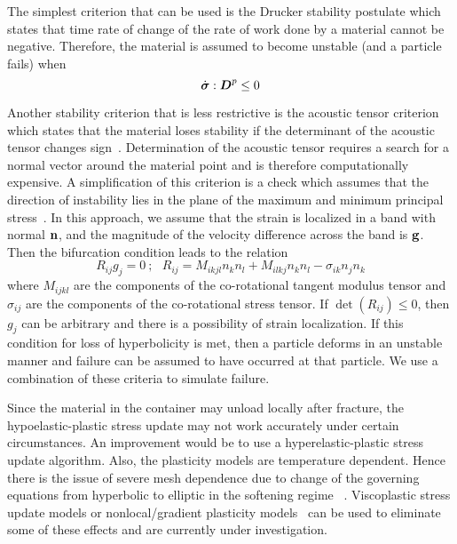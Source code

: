   The simplest criterion that can be used is the Drucker stability postulate 
  \cite{Drucker59} which states that time rate of change of the rate of 
  work done by a material cannot be negative.  Therefore, the material is 
  assumed to become unstable (and a particle fails) when
  \begin{equation}
    \dot\Bsig:\BD^p \le 0
  \end{equation}

  Another stability criterion that is less restrictive is the acoustic
  tensor criterion which states that the material loses stability if the 
  determinant of the acoustic tensor changes sign~\cite{Rudnicki75,Perzyna98}.  
  Determination of the acoustic tensor requires a search for a normal vector 
  around the material point and is therefore computationally expensive.  A 
  simplification of this criterion is a check which assumes that the direction 
  of instability lies in the plane of the maximum and minimum principal 
  stress~\cite{Becker02}.  In this approach, we assume that the strain is 
  localized in a band with normal $\Bn$, and the magnitude of the velocity 
  difference across the band is $\Bg$.  Then the bifurcation condition 
  leads to the relation 
  \begin{equation} 
    R_{ij} g_{j} = 0 ~;~~~
    R_{ij} = M_{ikjl} n_k n_l + M_{ilkj} n_k n_l - \sigma_{ik} n_j n_k
  \end{equation} 
  where $M_{ijkl}$ are the components of the co-rotational tangent
  modulus tensor and $\sigma_{ij}$ are the components of the co-rotational 
  stress tensor.  If $\det(R_{ij}) \le 0 $, then $g_j$ can be arbitrary and 
  there is a possibility of strain localization.  If this condition for 
  loss of hyperbolicity is met,  then a particle deforms in an unstable 
  manner and failure can be assumed to have occurred at that particle.  
  We use a combination of these criteria to simulate failure.

  Since the material in the container may unload locally after fracture, the 
  hypoelastic-plastic stress update may not work accurately under certain 
  circumstances.  An improvement would be to use a hyperelastic-plastic stress 
  update algorithm.  Also, the plasticity models are temperature dependent.
  Hence there is the issue of severe mesh dependence due to change of the
  governing equations from hyperbolic to elliptic in the softening regime
  ~\cite{Hill75,Bazant85,Tver90}.  Viscoplastic stress update models or 
  nonlocal/gradient plasticity models~\cite{Ramaswamy98,Hao00} can be used 
  to eliminate some of these effects and are currently under investigation. 

